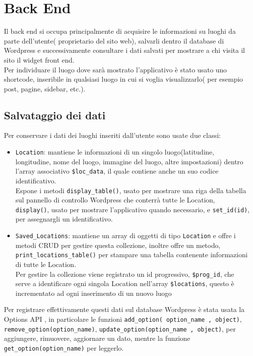\section*{Back End}
Il back end si occupa principalmente di acquisire le informazioni su luoghi da parte dell'utente( proprietario del sito web), salvarli dentro il database di Wordpress e successivamente consultare i dati salvati per mostrare a chi visita il sito il widget front end.\\
Per individuare il luogo dove sarà mostrato l'applicativo è stato usato uno shortcode, inseribile in qualsiasi luogo in cui si voglia visualizzarlo( per esempio post, pagine, sidebar, etc.).
\subsection*{Salvataggio dei dati}
Per conservare i dati dei luoghi inseriti dall'utente sono usate due classi:
\begin{itemize}
\item \texttt{Location}: mantiene le informazioni di un singolo luogo(latitudine, longitudine, nome del luogo, immagine del luogo, altre impostazioni) dentro l'array associativo \texttt{\$loc\_data}, il quale contiene anche un suo codice identificativo. \\
Espone i metodi \texttt{display\_table()}, usato  per mostrare una riga della tabella sul pannello di controllo Wordpress che conterrà tutte le Location,  \texttt{display()}, usato per mostrare l'applicativo quando necessario, e \texttt{set\_id(id)}, per assegnargli un identificativo.
\item \texttt{Saved\_Locations}: mantiene un array di oggetti di tipo \texttt{Location} e offre i metodi CRUD per gestire questa collezione, inoltre offre un metodo, \\\texttt{print\_locations\_table()} per stampare una tabella contenente informazioni di tutte le Location.\\
Per gestire la collezione viene registrato un id progressivo, \texttt{\$prog\_id}, che serve a identificare ogni singola Location nell'array \texttt{\$locations}, questo è incrementato ad ogni inserimento di un nuovo luogo
\end{itemize}
Per registrare effettivamente questi dati sul database Wordpress è stata usata la Options API \cite{options}, in particolare le funzioni \texttt{add\_option( option\_name , object)}, \texttt{remove\_option(option\_name)}, \texttt{update\_option(option\_name , object)}, per aggiungere, rimuovere, aggiornare un dato, mentre la funzione \texttt{get\_option(option\_name)} per leggerlo.
